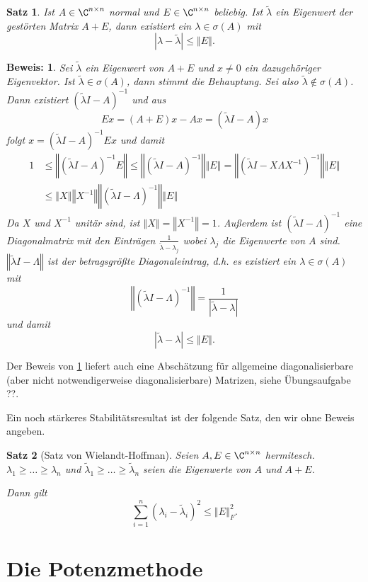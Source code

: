 \documentclass[
]{mycourse}
\theoremstyle{mythm}
\newtheorem{theorem}{Satz}[chapter]
\theoremstyle{break}
\newtheorem*{beweis}{Beweis:}
\newcommand{\norm}[1]{\left\Vert#1\right\Vert}		%
\begin{document}
\begin{theorem}\label{thm:stabEW}
Ist $A\in \C^{n\times n}$ normal und $E\in \C^{n\times n}$ beliebig. Ist $\tilde \lambda$ ein Eigenwert der gestörten Matrix
$A+E$, dann existiert ein $\lambda\in \sigma(A)$ mit
\[
|\lambda-\tilde \lambda| \leq \norm{E}.
\]
\end{theorem}
\begin{beweis}
Sei $\tilde \lambda$ ein Eigenwert von $A+E$ und $x\neq 0$ ein dazugehöriger Eigenvektor.
Ist $\tilde \lambda\in \sigma(A)$, dann stimmt die Behauptung. Sei also $\tilde \lambda\not\in \sigma(A)$. Dann existiert $(\tilde \lambda I-A)^{-1}$ und
aus
\[
Ex=(A+E)x-Ax=(\tilde \lambda I - A)x
\]
folgt $x=(\tilde \lambda I - A)^{-1} Ex$ und damit
\begin{align*}
1 & \leq \norm{(\tilde \lambda I - A)^{-1} E} \leq \norm{(\tilde \lambda I - A)^{-1}} \norm{E}
= \norm{(\tilde \lambda I - X \Lambda X^{-1})^{-1}} \norm{E} \\
&\leq   \norm{X} \norm{X^{-1}} \norm{(\tilde \lambda I - \Lambda )^{-1}} \norm{E}
\end{align*}
Da $X$ und $X^{-1}$ unitär sind, ist $\norm{X}=\norm{X^{-1}}=1$. Außerdem ist 
$(\tilde\lambda I -\Lambda)^{-1}$ eine
Diagonalmatrix mit den Einträgen $\frac{1}{\tilde \lambda- \lambda_j}$ wobei $\lambda_j$ die Eigenwerte von $A$ sind.
$\norm{\tilde \lambda I -\Lambda}$ ist der betragsgrößte Diagonaleintrag, d.h. es existiert ein $\lambda\in \sigma(A)$ mit
\[
\norm{(\tilde \lambda I -\Lambda)^{-1}}=\frac{1}{|\tilde \lambda-\lambda|}
\]
und damit
\[
|\tilde \lambda-\lambda|\leq \norm{E}. 
\]
\phantom{ende}
\end{beweis}

Der Beweis von \ref{thm:stabEW} liefert auch eine Abschätzung für allgemeine diagonalisierbare
(aber nicht notwendigerweise diagonalisierbare) Matrizen, siehe Übungsaufgabe ??.

Ein noch stärkeres Stabilitätsresultat ist der folgende Satz, den wir ohne Beweis angeben.
\begin{theorem}[Satz von Wielandt-Hoffman]
Seien $A,E\in \C^{n\times n}$ hermitesch. $\lambda_1\geq \ldots \geq \lambda_n$ und 
$\tilde \lambda_1\geq \ldots \geq \tilde \lambda_n$ seien die Eigenwerte von $A$ und $A+E$.

Dann gilt
\[
\sum_{i=1}^n (\lambda_i-\tilde \lambda_i)^2 \leq \norm{E}_F^2.
\]
\end{theorem}

\section{Die Potenzmethode}
\end{document}

